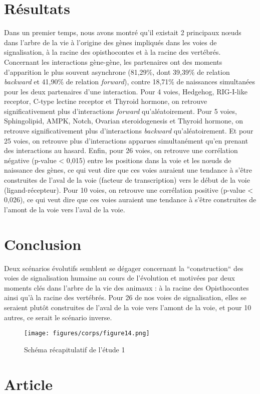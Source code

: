 \section{Résultats}
\par Dans un premier temps, nous avons montré qu’il existait 2 principaux nœuds dans l’arbre de la vie à l’origine des gènes impliqués dans les voies de signalisation, à la racine des opisthocontes et à la racine des vertébrés. Concernant les interactions gène-gène, les partenaires ont des moments d’apparition le plus souvent asynchrone (81,29\%, dont 39,39\% de relation \textit{backward} et 41,90\% de relation \textit{forward}), contre 18,71\% de naissances simultanées pour les deux partenaires d’une interaction. Pour 4 voies, Hedgehog, RIG-I-like receptor, C-type lectine receptor et Thyroid hormone, on retrouve significativement plus d’interactions \textit{forward} qu’aléatoirement. Pour 5 voies, Sphingolipid, AMPK, Notch, Ovarian steroidogenesis et Thyroid hormone, on retrouve significativement plus d’interactions \textit{backward} qu’aléatoirement. Et pour 25 voies, on retrouve plus d’interactions apparues simultanément qu’en prenant des interactions au hasard. Enfin, pour 26 voies, on retrouve une corrélation négative (p-value < 0,015) entre les positions dans la voie et les nœuds de naissance des gènes, ce qui veut dire que ces voies auraient une tendance à s’être construites de l’aval de la voie (facteur de transcription) vers le début de la voie (ligand-récepteur). Pour 10 voies, on retrouve une corrélation positive (p-value < 0,026), ce qui veut dire que ces voies auraient une tendance à s’être construites de l’amont de la voie vers l’aval de la voie. 

\section{Conclusion}
\par Deux scénarios évolutifs semblent se dégager concernant la “construction“ des voies de signalisation humaine au cours de l’évolution et motivées par deux moments clés dans l’arbre de la vie des animaux : à la racine des Opisthocontes ainsi qu’à la racine des vertébrés. Pour 26 de nos voies de signalisation, elles se seraient plutôt construites de l’aval de la voie vers l’amont de la voie, et pour 10 autres, ce serait le scénario inverse.

\begin{figure}[H]
    \centering
    \texttt{[image: figures/corps/figure14.png]}
    \caption{Schéma récapitulatif de l'étude 1}
    \label{fig:14_schéma1}
\end{figure}

\section{Article}\label{art1}



